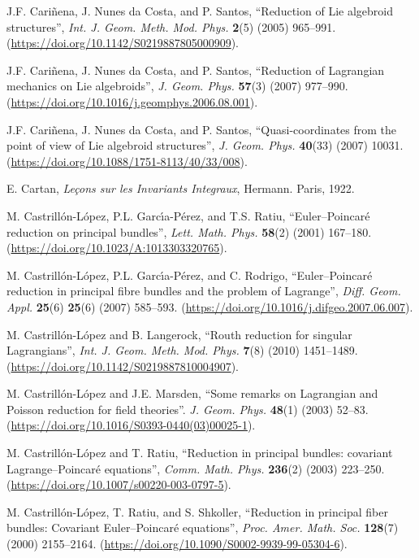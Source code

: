 \documentclass[12pt]{report}
\begin{document}
\begin{thebibliography}{999}
J.F. Cari\~nena, J. Nunes da Costa, and P. Santos,
``Reduction of  Lie algebroid structures'',
 {\sl Int. J. Geom. Meth. Mod. Phys.} {\bf 2}(5) (2005) 965--991.
(\url{https://doi.org/10.1142/S0219887805000909}).

J.F. Cari\~nena, J. Nunes da Costa, and P. Santos,
``Reduction of Lagrangian mechanics on Lie algebroids'',
{\sl J. Geom. Phys.} {\bf 57}(3) (2007) 977--990.
(\url{https://doi.org/10.1016/j.geomphys.2006.08.001}).

J.F. Cari\~nena, J. Nunes da Costa, and P. Santos,
``Quasi-coordinates from the point of view of Lie algebroid structures'',
{\sl J. Geom. Phys.} {\bf 40}(33) (2007) 10031.
(\url{https://doi.org/10.1088/1751-8113/40/33/008}).

E. Cartan, {\it Le\c{c}ons sur les Invariants Integraux}, Hermann. Paris, 1922.

M. Castrill\'{o}n-L\'{o}pez, P.L. Garc\'{\i}a-P\'{e}rez, and T.S. Ratiu,
    ``Euler--Poincar\'{e} reduction on principal bundles'',  
{\sl Lett. Math. Phys.}  {\bf 58}(2)  (2001) 167--180.
(\url{https://doi.org/10.1023/A:1013303320765}).

M. Castrill\'{o}n-L\'{o}pez, P.L. Garc\'{\i}a-P\'{e}rez, and C. Rodrigo,
    ``Euler--Poincar\'{e} reduction in principal fibre bundles and the problem of Lagrange'',
    {\sl Diff. Geom. Appl.} {\bf 25}(6) {\bf 25}(6) (2007) 585--593.
(\url{https://doi.org/10.1016/j.difgeo.2007.06.007}).

M. Castrill\'on-L\'opez and B. Langerock,
 ``Routh reduction for singular Lagrangians'',
 {\sl Int. J. Geom. Meth. Mod. Phys.} {\bf 7}(8) (2010) 1451--1489.
(\url{https://doi.org/10.1142/S0219887810004907}).

M. Castrill\'on-L\'opez and J.E. Marsden,
``Some remarks on Lagrangian and Poisson reduction for field theories''.
{\sl J. Geom. Phys.} {\bf 48}(1) (2003) 52--83.
(\url{https://doi.org/10.1016/S0393-0440(03)00025-1}).

M. Castrill\'on-L\'opez and T. Ratiu,
``Reduction in principal bundles: covariant Lagrange--Poincar\'{e} equations'',
{\sl Comm. Math. Phys.} { \bf 236}(2) (2003) 223--250.
(\url{https://doi.org/10.1007/s00220-003-0797-5}).

{\rm M. Castrill\'on-L\'opez, T. Ratiu, and S. Shkoller},
``Reduction in principal fiber bundles: Covariant Euler--Poincar\'{e} equations'',
{\sl Proc. Amer. Math. Soc.} {\bf 128}(7) (2000) 2155--2164.
(\url{https://doi.org/10.1090/S0002-9939-99-05304-6}).


\end{thebibliography}
\end{document}
